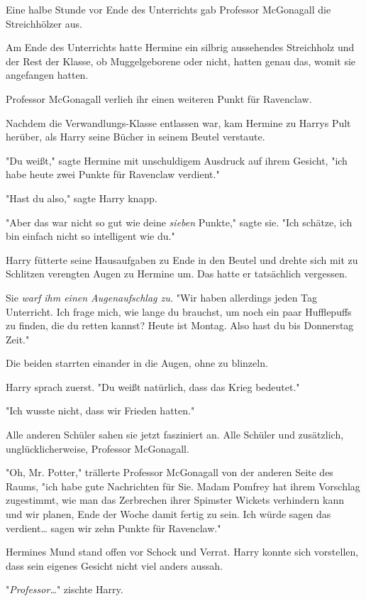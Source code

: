 {Eine halbe Stunde vor Ende des Unterrichts gab Professor McGonagall die Streichhölzer aus.

Am Ende des Unterrichts hatte Hermine ein silbrig aussehendes Streichholz und der Rest der Klasse, ob Muggelgeborene oder nicht, hatten genau das, womit sie angefangen hatten.

Professor McGonagall verlieh ihr einen weiteren Punkt für Ravenclaw.

\later

Nachdem die Verwandlungs-Klasse entlassen war, kam Hermine zu Harrys Pult herüber, als Harry seine Bücher in seinem Beutel verstaute.

"Du weißt," sagte Hermine mit unschuldigem Ausdruck auf ihrem Gesicht, "ich habe heute zwei Punkte für Ravenclaw verdient."

"Hast du also," sagte Harry knapp.

"Aber das war nicht so gut wie deine \emph{sieben} Punkte," sagte sie. "Ich schätze, ich bin einfach nicht so intelligent wie du."

Harry fütterte seine Hausaufgaben zu Ende in den Beutel und drehte sich mit zu Schlitzen verengten Augen zu Hermine um. Das hatte er tatsächlich vergessen.

Sie \emph{warf ihm einen Augenaufschlag zu.} "Wir haben allerdings jeden Tag Unterricht. Ich frage mich, wie lange du brauchst, um noch ein paar Hufflepuffs zu finden, die du retten kannst? Heute ist Montag. Also hast du bis Donnerstag Zeit."

Die beiden starrten einander in die Augen, ohne zu blinzeln.

Harry sprach zuerst. "Du weißt natürlich, dass das Krieg bedeutet."

"Ich wusste nicht, dass wir Frieden hatten."

Alle anderen Schüler sahen sie jetzt fasziniert an. Alle Schüler und zusätzlich, unglücklicherweise, Professor McGonagall.

"Oh, Mr. Potter," trällerte Professor McGonagall von der anderen Seite des Raums, "ich habe gute Nachrichten für Sie. Madam Pomfrey hat ihrem Vorschlag zugestimmt, wie man das Zerbrechen ihrer Spimster Wickets verhindern kann und wir planen, Ende der Woche damit fertig zu sein. Ich würde sagen das verdient… sagen wir zehn Punkte für Ravenclaw."

Hermines Mund stand offen vor Schock und Verrat. Harry konnte sich vorstellen, dass sein eigenes Gesicht nicht viel anders aussah.

"\emph{Professor…}" zischte Harry.

}
